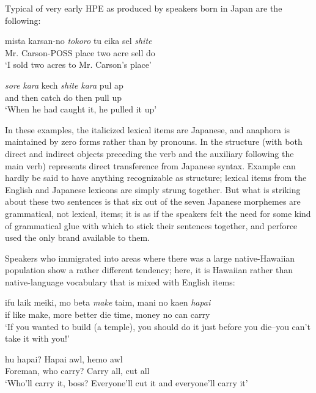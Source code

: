 Typical of very early HPE as produced by speakers born in Japan are the following:

\ea\label{ex:1}
 \gll mista karsan-no \textit{to}\textit{k}\textit{oro} tu eika sel \textit{shite}\\
  Mr. Carson-POSS place two acre sell do \\
\glt  `I sold two acres to Mr. Carson's place'
\z

\ea\label{ex:2}
 \gll \textit{sore} \textit{kara} kech \textit{shite} \textit{kara} pul ap \\
and then catch do then pull up\\
\glt  `When he had caught it, he pulled it up'
\z


\noindent In these examples, the italicized lexical items are Japanese, and ana\-phora is maintained by zero forms rather than by pronouns. In  the structure (with both direct and indirect objects preceding the verb and the auxiliary following the main verb) represents direct transference from Japanese syntax. Example  can hardly be said to have anything recognizable as structure; lexical items from the English and Japanese lexicons are simply strung together. But what is striking about these two sentences is that six out of the seven Japanese morphemes are grammatical, not lexical, items; it is as if the speakers felt the need for some kind of grammatical glue with which to stick their sentences together, and perforce used the only brand available to them.

Speakers who immigrated into areas where there was a large native-Hawaiian population show a rather different tendency; here, it is Hawaiian rather than native-language vocabulary that is mixed with English items:

\ea\label{ex:3}
 \gll ifu laik meiki, mo beta \textit{make} taim, mani no kaen \textit{hapai} \\
if like make, more better die time, money no can carry \\
\glt  `If you wanted to build (a temple), you should do it just before you die--you can't take it with you!'
\z

\ea\label{ex:4}
 hu {hapai?} {Hapai} awl, {hemo} awl\\
 Foreman, who {carry?} Carry all, cut all\\
\glt  `Who'll carry it, boss? Everyone'll cut it and everyone'll carry it'
\z

